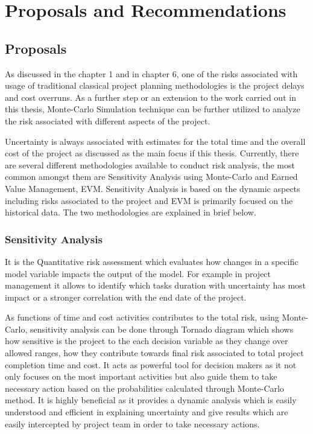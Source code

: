\let\textcircled=\pgftextcircled
\chapter{Proposals and Recommendations}
\section{Proposals} 
As discussed in the chapter 1 and in chapter 6, one of the risks associated with usage of traditional classical project planning methodologies is the project delays and cost overruns. As a further step or an extension to the work carried out in this thesis, Monte-Carlo Simulation technique can be further utilized to analyze the risk associated with different aspects of the project. 

Uncertainty is always associated with estimates for the total time and the overall cost of the project as discussed as the main focus if this thesis. Currently, there are several different methodologies available to conduct risk analysis, the most common amongst them are Sensitivity Analysis using Monte-Carlo and Earned Value Management, EVM. Sensitivity Analysis is based on the dynamic aspects including risks associated to the project and EVM is primarily focused on the historical data. The two methodologies are explained in brief below. 

\subsection{Sensitivity Analysis}

It is the Quantitative risk assessment\cite{Wood2002RiskST}  which evaluates how changes in a specific model variable impacts the output of the model. For example in project management it allows to identify which tasks duration with uncertainty has most impact or a stronger correlation with the end date of the project.

As functions of time and cost activities contributes to the total risk, using Monte-Carlo, sensitivity analysis can be done through Tornado diagram which shows how sensitive is the project to the each decision variable as they change over allowed ranges, how they contribute towards final risk associated to total project completion  time and cost. It acts as powerful tool for decision makers as it not only focuses on the most important activities but also guide them to take necessary action based on the probabilities calculated through Monte-Carlo method. It is highly beneficial as it provides a dynamic analysis which is easily understood and efficient in explaining uncertainty and give results which are easily intercepted by project team in order to take necessary actions.

